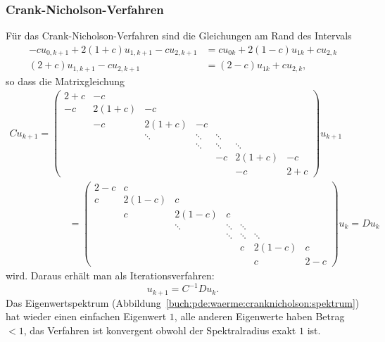 \subsubsection{Crank-Nicholson-Verfahren}
Für das Crank-Nicholson-Verfahren sind die Gleichungen am Rand
des Intervals
\begin{align*}
-cu_{0,k+1}+2(1+c)u_{1,k+1}-cu_{2,k+1}
&=
cu_{0k}+2(1-c)u_{1k}+cu_{2,k}
\\
(2+c)u_{1,k+1}-cu_{2,k+1}
&=
(2-c)u_{1k}+cu_{2,k},
\end{align*}
so dass die Matrixgleichung
\begin{gather*}
Cu_{k+1}
=
\begin{pmatrix}
 2+c &  -c  &      &      &      &      &      \\
  -c &2(1+c)&  -c  &      &      &      &      \\
     &   -c &2(1+c)&  -c  &      &      &      \\
     &      &\ddots&\ddots&\ddots&      &      \\
     &      &      &\ddots&\ddots&\ddots&      \\
     &      &      &      &   -c &2(1+c)&  -c  \\
     &      &      &      &      &  -c  &  2+c
\end{pmatrix}
u_{k+1}
\qquad
\qquad
\qquad
\\
\qquad
\qquad
\qquad
=
\begin{pmatrix}
 2-c &   c  &      &      &      &      &      \\
   c &2(1-c)&   c  &      &      &      &      \\
     &    c &2(1-c)&   c  &      &      &      \\
     &      &\ddots&\ddots&\ddots&      &      \\
     &      &      &\ddots&\ddots&\ddots&      \\
     &      &      &      &    c &2(1-c)&   c  \\
     &      &      &      &      &   c  &  2-c
\end{pmatrix}
u_k
=
Du_k
\end{gather*}
wird.
Daraus erhält man als Iterationsverfahren:
\[
u_{k+1} = C^{-1}Du_k.
\]
Das Eigenwertspektrum (Abbildung~\ref{buch:pde:waerme:cranknicholson:spektrum})
hat wieder einen einfachen Eigenwert $1$,
alle anderen Eigenwerte haben Betrag $<1$, das Verfahren ist
konvergent obwohl der Spektralradius exakt $1$ ist.
